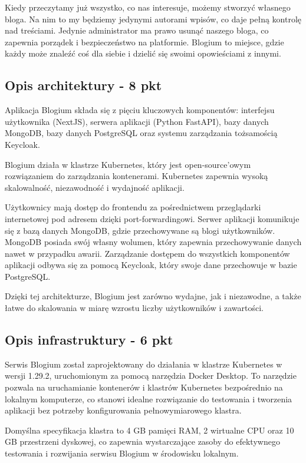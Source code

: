 \documentclass[12pt,a4paper]{article}
\newcommand{\MYhref}[3][blue]{\href{#2}{\color{#1}{#3}}}%
\begin{document}
Kiedy przeczytamy już wszystko, co nas interesuje, możemy stworzyć własnego bloga. Na nim to my będziemy jedynymi autorami wpisów, co daje pełną kontrolę nad treściami. Jedynie administrator ma prawo usunąć naszego bloga, co zapewnia porządek i bezpieczeństwo na platformie. Blogium to miejsce, gdzie każdy może znaleźć coś dla siebie i dzielić się swoimi opowieściami z innymi.

\subsection{Opis architektury - 8 pkt}
\label{sec:introduction}

Aplikacja Blogium składa się z pięciu kluczowych komponentów: interfejsu użytkownika (NextJS), serwera aplikacji (Python FastAPI), bazy danych MongoDB, bazy danych PostgreSQL oraz systemu zarządzania tożsamością Keycloak.

Blogium działa w klastrze Kubernetes, który jest open-source'owym rozwiązaniem do zarządzania kontenerami. Kubernetes zapewnia wysoką skalowalność, niezawodność i wydajność aplikacji.

Użytkownicy mają dostęp do frontendu za pośrednictwem przeglądarki internetowej pod adresem \MYhref[blue]{http://localhost:3000}{localhost:3000} dzięki port-forwardingowi. Serwer aplikacji komunikuje się z bazą danych MongoDB, gdzie przechowywane są blogi użytkowników. MongoDB posiada swój własny wolumen, który zapewnia przechowywanie danych nawet w przypadku awarii. Zarządzanie dostępem do wszystkich komponentów aplikacji odbywa się za pomocą Keycloak, który swoje dane przechowuje w bazie PostgreSQL.

Dzięki tej architekturze, Blogium jest zarówno wydajne, jak i niezawodne, a także łatwe do skalowania w miarę wzrostu liczby użytkowników i zawartości.

\subsection{Opis infrastruktury - 6 pkt}
\label{sec:Users}

Serwis Blogium został zaprojektowany do działania w klastrze Kubernetes w wersji 1.29.2, uruchomionym za pomocą narzędzia Docker Desktop. To narzędzie pozwala na uruchamianie kontenerów i klastrów Kubernetes bezpośrednio na lokalnym komputerze, co stanowi idealne rozwiązanie do testowania i tworzenia aplikacji bez potrzeby konfigurowania pełnowymiarowego klastra.

Domyślna specyfikacja klastra to 4 GB pamięci RAM, 2 wirtualne CPU oraz 10 GB przestrzeni dyskowej, co zapewnia wystarczające zasoby do efektywnego testowania i rozwijania serwisu Blogium w środowisku lokalnym.
\end{document}
